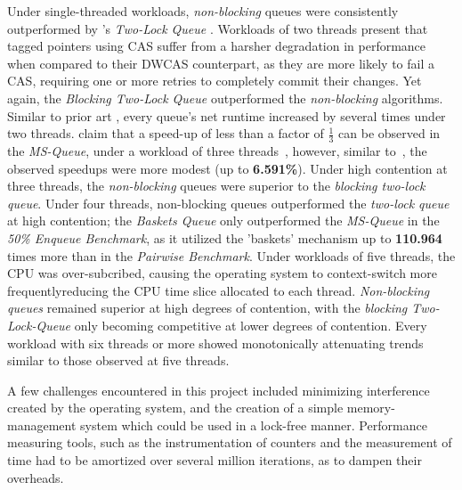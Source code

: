 Under single-threaded workloads, \emph{non-blocking} queues were consistently
outperformed by \citeauthor{michael1996simple}'s \emph{Two-Lock Queue}
\citep{michael1996simple}.
Workloads of two threads present that tagged pointers using CAS suffer from a
harsher degradation in performance when compared to their DWCAS counterpart, as
they are more likely to fail a CAS, requiring one or more retries to completely
commit their changes. Yet again, the \emph{Blocking Two-Lock Queue}
outperformed the \emph{non-blocking} algorithms. 
Similar to prior art
\citep{hoffman2007baskets,michael1996simple,ladan2008optimistic}, every queue's
net runtime increased by several times under two threads.
\citeauthor{michael1996simple} claim that a speed-up of less than a factor of
$\frac{1}{3}$ can be observed in the \emph{MS-Queue}, under a workload of three threads~\citep{michael1996simple},
however, similar to~\citep{ladan2008optimistic,hoffman2007baskets}, the
observed speedups were more modest (up to \textbf{6.591\%}).
Under high contention at three threads, the \emph{non-blocking} queues were
superior to the \emph{blocking two-lock queue}. 
Under four threads, non-blocking queues outperformed the \emph{two-lock queue} at
high contention; the \emph{Baskets Queue} only outperformed the \emph{MS-Queue}
in the \emph{50\% Enqueue Benchmark}, as it utilized the 'baskets' mechanism up
to \textbf{110.964} times more than in the \emph{Pairwise Benchmark}. Under
workloads of five threads, the CPU was over-subcribed, causing the operating
system to context-switch more frequently\textemdash reducing the CPU time slice
allocated to each thread. \emph{Non-blocking queues} remained superior at high
degrees of contention, with the \emph{blocking Two-Lock-Queue} only becoming
competitive at lower degrees of contention. Every workload with six threads or
more showed monotonically attenuating trends similar to those observed at five
threads.

A few challenges encountered in this project included minimizing interference
created by the operating system, and the creation of a simple memory-management
system which could be used in a lock-free manner.
Performance measuring tools, such as the instrumentation of counters and the
measurement of time had to be amortized over several million iterations, as to
dampen their overheads.